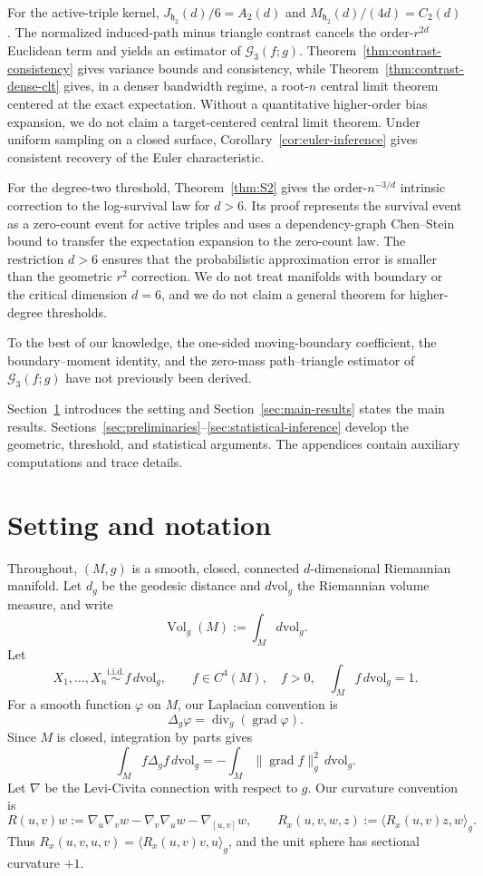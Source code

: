 \documentclass[11pt]{article}
\theoremstyle{remark}
\newcommand{\Vol}{\operatorname{Vol}}
\newcommand{\grad}{\operatorname{grad}}
\numberwithin{equation}{section}
\begin{document}
For the active-triple kernel,
$J_{\mathfrak h_2}(d)/6=A_2(d)$ and
$M_{\mathfrak h_2}(d)/(4d)=C_2(d)$.
The normalized induced-path minus triangle contrast cancels the order-$r^{2d}$
Euclidean term and yields an estimator of $\mathcal G_3(f;g)$.
Theorem~\ref{thm:contrast-consistency} gives variance bounds and consistency,
while Theorem~\ref{thm:contrast-dense-clt} gives, in a denser bandwidth
regime, a root-$n$ central limit theorem centered at the exact expectation.
Without a quantitative higher-order bias expansion, we do not claim a
target-centered central limit theorem.  Under uniform sampling on a closed
surface, Corollary~\ref{cor:euler-inference} gives consistent recovery of the
Euler characteristic.

For the degree-two threshold, Theorem~\ref{thm:S2} gives the
order-$n^{-3/d}$ intrinsic correction to the log-survival law for $d>6$.
Its proof represents the survival event as a zero-count event for active
triples and uses a dependency-graph Chen--Stein bound to transfer the
expectation expansion to the zero-count law.  The restriction $d>6$ ensures
that the probabilistic approximation error is smaller than the geometric
$r^2$ correction.  We do not treat manifolds with boundary or the critical
dimension $d=6$, and we do not claim a general theorem for higher-degree
thresholds.

To the best of our knowledge, the one-sided moving-boundary coefficient,
the boundary--moment identity, and the zero-mass path--triangle estimator of
$\mathcal G_3(f;g)$ have not previously been derived.

Section~\ref{sec:setting} introduces the setting and
Section~\ref{sec:main-results} states the main results.
Sections~\ref{sec:preliminaries}--\ref{sec:statistical-inference}
develop the geometric, threshold, and statistical arguments.
The appendices contain auxiliary computations and trace details.

\section{Setting and notation}
\label{sec:setting}

Throughout, $(M,g)$ is a smooth, closed, connected $d$-dimensional Riemannian
manifold.  Let $d_g$ be the geodesic distance and $d\mathrm{vol}_g$ the
Riemannian volume measure, and write
\[
\Vol_g(M):=\int_M d\mathrm{vol}_g.
\]
Let
\[
X_1,\ldots,X_n\overset{\mathrm{i.i.d.}}{\sim} f\,d\mathrm{vol}_g,
\qquad
f\in C^4(M),\quad f>0,\quad \int_M f\,d\mathrm{vol}_g=1.
\]
For a smooth function $\varphi$ on $M$,
our Laplacian convention is
\[
\Delta_g\varphi=\operatorname{div}_g (\grad\varphi).
\]
Since $M$ is closed, integration by parts gives
\[
\int_M f\Delta_g f\,d\mathrm{vol}_g=-\int_M \|\grad f\|_g^2\,d\mathrm{vol}_g.
\]
Let $\nabla$ be the Levi-Civita connection with respect to $g$.
Our curvature convention is
\[
R(u,v)w
:=\nabla_u\nabla_vw-\nabla_v\nabla_uw-\nabla_{[u,v]}w,
\qquad
R_x(u,v,w,z):=\langle R_x(u,v)z,w\rangle_g.
\]
Thus $R_x(u,v,u,v)=\langle R_x(u,v)v,u\rangle_g$, and the unit
sphere has sectional curvature $+1$.
\end{document}
